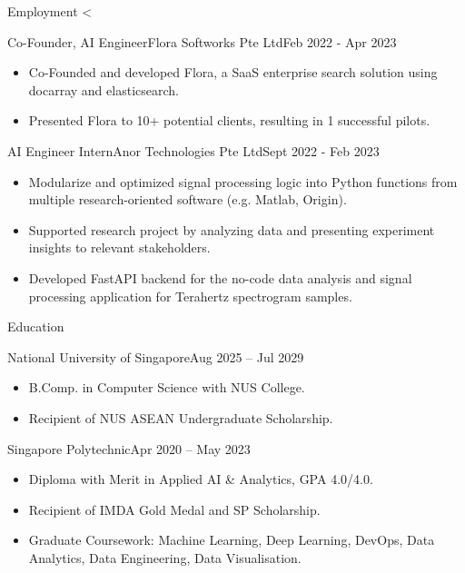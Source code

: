 \documentclass[]{mcdowellcv}
\begin{document}
	\makeheader
	

	\begin{cvsection}{Employment}
		<%
		\begin{cvsubsection}{Co-Founder, AI Engineer}{Flora Softworks Pte Ltd}{Feb 2022 - Apr 2023}
			\begin{itemize}
            \item Co-Founded and developed Flora, a SaaS enterprise search solution using docarray and elasticsearch.
			\item Presented Flora to 10+ potential clients, resulting in 1 successful pilots.
			\end{itemize}
		\end{cvsubsection}

		\begin{cvsubsection}{AI Engineer Intern}{Anor Technologies Pte Ltd}{Sept 2022 - Feb 2023}	
			\begin{itemize}
				\item Modularize and optimized signal processing logic into Python functions from multiple research-oriented software (e.g. Matlab, Origin).
				\item Supported research project by analyzing data and presenting experiment insights to relevant stakeholders.
				\item Developed FastAPI backend for the no-code data analysis and signal processing application for Terahertz spectrogram samples.
			\end{itemize}
		\end{cvsubsection}
	\end{cvsection}
	
	\begin{cvsection}{Education}
		\begin{cvsubsection}{National University of Singapore}{}{Aug 2025 -- Jul 2029}
			\begin{itemize}
				\item B.Comp. in Computer Science with NUS College.
				\item Recipient of NUS ASEAN Undergraduate Scholarship.
			\end{itemize}
		\end{cvsubsection}
		\begin{cvsubsection}{Singapore Polytechnic}{}{Apr 2020 -- May 2023}
			\begin{itemize}
				\item Diploma with Merit in Applied AI \& Analytics, GPA 4.0/4.0.
				\item Recipient of IMDA Gold Medal and SP Scholarship.
				\item Graduate Coursework: Machine Learning, Deep Learning, DevOps, Data Analytics, Data Engineering, Data Visualisation.
			\end{itemize}
		\end{cvsubsection}
	\end{cvsection}
		
\end{document}
